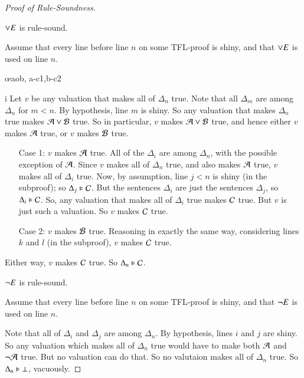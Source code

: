 \documentclass[12pt, a4paper, oneside, openright, titlepage]{book}
\begin{document}
\begin{proof}[Proof of Rule-Soundness]
    \begin{claim}[5]
        $\vee E$ is rule-sound.
    \end{claim}
    Assume that every line before line $n$ on some TFL-proof is shiny, and that $\vee E$ is used on line $n$.
	\begin{fitchproof}
	   \open
	   \close
	   \open
	   \close
	   \oe{aob, a-c1,b-c2}
   \end{fitchproof}i
    Let $v$ be any valuation that makes all of $\Delta_n$ true. Note that all $\Delta_m$ are among $\Delta_n$ for $m < n$. By hypothesis, line $m$ is shiny. So any valuation that makes $\Delta_n$ true makes $\mathcal{A}\vee\mathcal{B}$ true. So in particular, $v$ makes $\mathcal{A}\vee \mathcal{B}$ true, and hence either $v$ makes $\mathcal{A}$ true, or $v$ makes $\mathcal{B}$ true. \begin{itemize}[leftmargin=+1in]
        \item[Case 1:] $v$ makes $\mathcal{A}$ true. All of the $\Delta_i$ are among $\Delta_n$, with the possible exception of $\mathcal{A}$. Since $v$ makes all of $\Delta_n$ true, and also makes $\mathcal{A}$ true, $v$ makes all of $\Delta_i$ true. Now, by assumption, line $j < n$ is shiny (in the subproof); so $\Delta_j\vDash \mathcal{C}$. But the sentences $\Delta_i$ are just the sentences $\Delta_j$, so $\Delta_i \vDash \mathcal{C}$. So, any valuation that makes all of $\Delta_i$ true makes $\mathcal{C}$ true. But $v$ is just such a valuation. So $v$ makes $\mathcal{C}$ true.
        \item[Case 2:] $v$ makes $\mathcal{B}$ true. Reasoning in exactly the same way, considering lines $k$ and $l$ (in the subproof), $v$ makes $\mathcal{C}$ true.
    \end{itemize}
    Either way, $v$ makes $\mathcal{C}$ true. So $\Delta_n\vDash \mathcal{C}$.


    \begin{claim}[6]
        $\neg E$ is rule-sound.
    \end{claim}
    Assume that every line before line $n$ on some TFL-proof is shiny, and that $\neg E$ is used on line $n$.
    \begin{fitchproof}
         
    \end{fitchproof}
    Note that all of $\Delta_i$ and $\Delta_j$ are among $\Delta_n$. By hypothesis, lines $i$ and $j$ are shiny. So any valuation which makes all of $\Delta_n$ true would have to make both $\mathcal{A}$ and $\neg\mathcal{A}$ true. But no valuation can do that. So no valutaion makes all of $\Delta_n$ true. So $\Delta_n \vDash \bot$, vacuously.



\end{proof}
\end{document}
